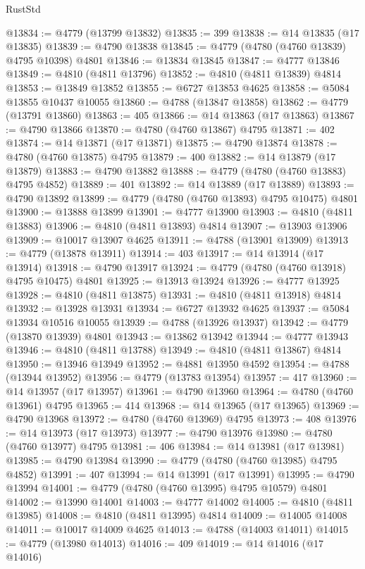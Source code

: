 \begin{lexlean}{RustStd}
\begin{coremodule}
@13834 := @4779 (@13799 @13832)
@13835 := 399
@13838 := @14 @13835 (@17 @13835)
@13839 := @4790 @13838
@13845 := @4779 (@4780 (@4760 @13839) @4795 @10398) @4801
@13846 := @13834 @13845
@13847 := @4777 @13846
@13849 := @4810 (@4811 @13796)
@13852 := @4810 (@4811 @13839) @4814
@13853 := @13849 @13852
@13855 := @6727 @13853 @4625
@13858 := @5084 @13855 @10437 @10055
@13860 := @4788 (@13847 @13858)
@13862 := @4779 (@13791 @13860)
@13863 := 405
@13866 := @14 @13863 (@17 @13863)
@13867 := @4790 @13866
@13870 := @4780 (@4760 @13867) @4795
@13871 := 402
@13874 := @14 @13871 (@17 @13871)
@13875 := @4790 @13874
@13878 := @4780 (@4760 @13875) @4795
@13879 := 400
@13882 := @14 @13879 (@17 @13879)
@13883 := @4790 @13882
@13888 := @4779 (@4780 (@4760 @13883) @4795 @4852)
@13889 := 401
@13892 := @14 @13889 (@17 @13889)
@13893 := @4790 @13892
@13899 := @4779 (@4780 (@4760 @13893) @4795 @10475) @4801
@13900 := @13888 @13899
@13901 := @4777 @13900
@13903 := @4810 (@4811 @13883)
@13906 := @4810 (@4811 @13893) @4814
@13907 := @13903 @13906
@13909 := @10017 @13907 @4625
@13911 := @4788 (@13901 @13909)
@13913 := @4779 (@13878 @13911)
@13914 := 403
@13917 := @14 @13914 (@17 @13914)
@13918 := @4790 @13917
@13924 := @4779 (@4780 (@4760 @13918) @4795 @10475) @4801
@13925 := @13913 @13924
@13926 := @4777 @13925
@13928 := @4810 (@4811 @13875)
@13931 := @4810 (@4811 @13918) @4814
@13932 := @13928 @13931
@13934 := @6727 @13932 @4625
@13937 := @5084 @13934 @10516 @10055
@13939 := @4788 (@13926 @13937)
@13942 := @4779 (@13870 @13939) @4801
@13943 := @13862 @13942
@13944 := @4777 @13943
@13946 := @4810 (@4811 @13788)
@13949 := @4810 (@4811 @13867) @4814
@13950 := @13946 @13949
@13952 := @4881 @13950 @4592
@13954 := @4788 (@13944 @13952)
@13956 := @4779 (@13783 @13954)
@13957 := 417
@13960 := @14 @13957 (@17 @13957)
@13961 := @4790 @13960
@13964 := @4780 (@4760 @13961) @4795
@13965 := 414
@13968 := @14 @13965 (@17 @13965)
@13969 := @4790 @13968
@13972 := @4780 (@4760 @13969) @4795
@13973 := 408
@13976 := @14 @13973 (@17 @13973)
@13977 := @4790 @13976
@13980 := @4780 (@4760 @13977) @4795
@13981 := 406
@13984 := @14 @13981 (@17 @13981)
@13985 := @4790 @13984
@13990 := @4779 (@4780 (@4760 @13985) @4795 @4852)
@13991 := 407
@13994 := @14 @13991 (@17 @13991)
@13995 := @4790 @13994
@14001 := @4779 (@4780 (@4760 @13995) @4795 @10579) @4801
@14002 := @13990 @14001
@14003 := @4777 @14002
@14005 := @4810 (@4811 @13985)
@14008 := @4810 (@4811 @13995) @4814
@14009 := @14005 @14008
@14011 := @10017 @14009 @4625
@14013 := @4788 (@14003 @14011)
@14015 := @4779 (@13980 @14013)
@14016 := 409
@14019 := @14 @14016 (@17 @14016)

\end{coremodule}
\end{lexlean}
